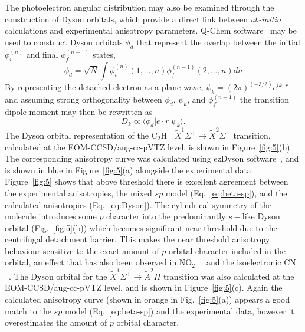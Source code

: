 \documentclass[aip,graphicx]{revtex4-1}
\begin{document}
The photoelectron angular distribution may also be examined through the construction of Dyson orbitals, which provide a direct link between \emph{ab-initio} calculations and experimental anisotropy parameters. Q-Chem software~\cite{sha15} may be used to construct Dyson orbitals $\phi_d$ that represent the overlap between the initial $\phi_i^{(n)}$ and final $\phi_f^{(n-1)}$ states,
\begin{equation}
\phi_d = \sqrt{N}\int\phi_i^{(n)}(1,\dots,n)\phi_f^{(n-1)}(2,\dots,n)dn
\end{equation}
By representing the detached electron as a plane wave, $\psi_k=(2\pi)^{(-3/2)}e^{ik\cdot r}$ and assuming strong orthogonality between $\phi_d$, $\psi_k$, and $\phi_f^{(n-1)}$ the transition dipole moment may then be rewritten as
\begin{equation}
D_k \propto \langle \phi_d | e\cdot r | \psi_k\rangle.
\label{eq:Dyson}
\end{equation}
The Dyson orbital representation of the C$_2$H$^-$ $\tilde{X}^1\Sigma^+\rightarrow\tilde{X}^2\Sigma^+$ transition, calculated at the EOM-CCSD/aug-cc-pVTZ level, is shown in Figure~\ref{fig:5}(b). The corresponding anisotropy curve was calculated using ezDyson software~\cite{goz22}, and is shown in blue in Figure~\ref{fig:5}(a) alongside the experimental data. Figure~\ref{fig:5} shows that above threshold there is excellent agreement between the experimental anisotropies, the mixed $sp$ model (Eq.~\ref{eq:beta-sp}), and the calculated anisotropies (Eq.~\ref{eq:Dyson}). The cylindrical symmetry of the molecule introduces some $p$ character into the predominantly $s-$like Dyson orbital (Fig.~\ref{fig:5}(b)) which becomes significant near threshold due to the centrifugal detachment barrier. This makes the near threshold anisotropy behaviour sensitive to the exact amount of $p$ orbital character included in the orbital, an effect that has also been observed in NO$_2^-$ ~\cite{law19} and the isoelectronic CN$^-$ ~\cite{har21}. The Dyson orbital for the $\tilde{X}^1\Sigma^+\rightarrow\tilde{A} ^2\Pi$ transition was also calculated at the EOM-CCSD/aug-cc-pVTZ level, and is shown in Figure~\ref{fig:5}(c). Again the calculated anisotropy curve (shown in orange in Fig.~\ref{fig:5}(a)) appears a good match to the $sp$ model (Eq.~\ref{eq:beta-sp}) and the experimental data, however it overestimates the amount of $p$ orbital character.
\end{document}
